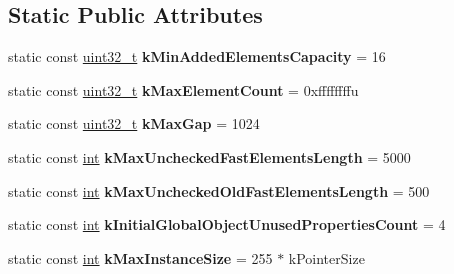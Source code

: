 \subsection*{Static Public Attributes}
\begin{DoxyCompactItemize}
\item 
\mbox{\label{classv8_1_1internal_1_1JSObject_aed19da50cc7b8f912b31886c6d61b7b5}} 
static const \mbox{\hyperlink{classuint32__t}{uint32\+\_\+t}} {\bfseries k\+Min\+Added\+Elements\+Capacity} = 16
\item 
\mbox{\label{classv8_1_1internal_1_1JSObject_a94879143e109d2b4105523b69de660a1}} 
static const \mbox{\hyperlink{classuint32__t}{uint32\+\_\+t}} {\bfseries k\+Max\+Element\+Count} = 0xffffffffu
\item 
\mbox{\label{classv8_1_1internal_1_1JSObject_a920eb1a5c2f03a3ca10ef3fcc5ac42fe}} 
static const \mbox{\hyperlink{classuint32__t}{uint32\+\_\+t}} {\bfseries k\+Max\+Gap} = 1024
\item 
\mbox{\label{classv8_1_1internal_1_1JSObject_abb22b3e9cd78800bced6ef8dd68447ce}} 
static const \mbox{\hyperlink{classint}{int}} {\bfseries k\+Max\+Unchecked\+Fast\+Elements\+Length} = 5000
\item 
\mbox{\label{classv8_1_1internal_1_1JSObject_af317066946eb7d04f0af04c0b1d69d93}} 
static const \mbox{\hyperlink{classint}{int}} {\bfseries k\+Max\+Unchecked\+Old\+Fast\+Elements\+Length} = 500
\item 
\mbox{\label{classv8_1_1internal_1_1JSObject_a7f5244c394b225cd572a03cb68ee22c2}} 
static const \mbox{\hyperlink{classint}{int}} {\bfseries k\+Initial\+Global\+Object\+Unused\+Properties\+Count} = 4
\item 
\mbox{\label{classv8_1_1internal_1_1JSObject_a3d270856f8e8f80f2a80c0c37bda1c23}} 
static const \mbox{\hyperlink{classint}{int}} {\bfseries k\+Max\+Instance\+Size} = 255 $\ast$ k\+Pointer\+Size
\item 
\mbox{\label{classv8_1_1internal_1_1JSObject_a29b37dbc6571c3318647807794a433c8}} 

\end{DoxyCompactItemize}
